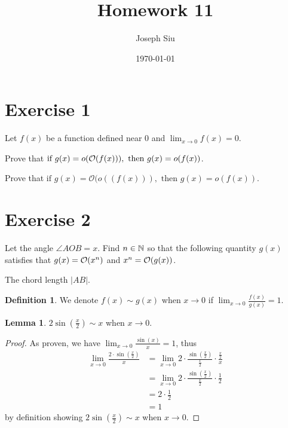 \documentclass{homework}
\author{Joseph Siu}
\date{\today}
\title{Homework 11}
\newcommand{\N}{\bb{N}} %
\newcommand{\?}{\stackrel{?}{=}}
\theoremstyle{definition}
\newtheorem*{definition}{Definition}
\newtheorem*{lemma}{Lemma}
\begin{document}
 \maketitle

\section*{Exercise 1}

Let $f(x)$ be a function defined near 0 and $\displaystyle\lim_{x\to0}f(x)=0$.

\question[1] Prove that $\textup{if~}g(x)=o(\mathcal{O}(f(x))),\mathrm{~then~}g(x)=o(f(x))$. 

\question[2] Prove that $\text{if~}g(x)=\mathcal{O}(o((f(x))),\text{~then~}g(x)=o(f(x))$.

\newpage
\section*{Exercise 2}
Let the angle $\angle AOB=x$. Find $n\in\N$ so that the following quantity $g(x)$ satisfies that $g(x)=\cal{O}(x^n)$ and $x^n=\cal{O}(g(x))$.


\question[1] The chord length $|AB|$.

\begin{definition}
    We denote $f(x)\sim g(x)$ when $x\to0$ if $\lim_{x\to0}\frac{f(x)}{g(x)}=1$.
\end{definition}

\begin{lemma}
    $2\sin(\frac{x}2)\sim x$ when $x\to0$.

    \begin{proof}
        As proven, we have $\lim_{x\to0}\frac{\sin(x)}{x}=1$, thus \begin{align*}
            \lim_{x\to0}\frac{2\cdot\sin(\frac{x}2)}{x}&=\lim_{x\to0}2\cdot\frac{\sin(\frac{x}2)}{\frac{x}2}\cdot\frac{\frac{x}2}{x}\\
            &=\lim_{x\to0}2\cdot\frac{\sin(\frac{x}2)}{\frac{x}2}\cdot\frac12\\
            &=2\cdot\frac12\\
            &=1
        \end{align*}
        by definition showing $2\sin(\frac{x}2)\sim x$ when $x\to0$.
    \end{proof}
\end{lemma}
\end{document}
